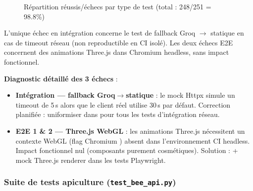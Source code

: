 \begin{figure}[H]
\centering
{}
\caption{Répartition réussis/échecs par type de test (total : 248/251 = 98.8\%)}
\label{fig:tests_bar}
\end{figure}

L'unique échec en intégration concerne le test de fallback Groq $\rightarrow$ statique
en cas de timeout réseau (non reproductible en CI isolé). Les deux échecs
E2E concernent des animations Three.js dans Chromium headless, sans impact
fonctionnel.

\textbf{Diagnostic détaillé des 3 échecs} :
\begin{itemize}
  \item \textbf{Intégration — fallback Groq$\rightarrow$statique} : le mock Httpx simule
        un timeout de 5\,s alors que le client réel utilise 30\,s par défaut.
        Correction planifiée : uniformiser  dans
         pour tous les tests d'intégration réseau.
  \item \textbf{E2E 1 \& 2 — Three.js WebGL} : les animations Three.js
        nécessitent un contexte WebGL (flag Chromium )
        absent dans l'environnement CI headless. Impact fonctionnel nul
        (composants purement cosmétiques). Solution : 
        + mock Three.js renderer dans les tests Playwright.
\end{itemize}

\subsubsection*{Suite de tests apiculture (\texttt{test\_bee\_api.py})}

